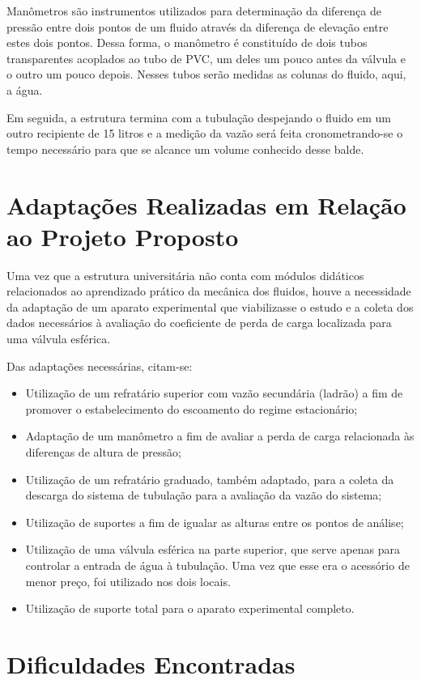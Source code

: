 Manômetros são instrumentos utilizados para determinação da diferença de 
pressão entre dois pontos de um fluido através
da diferença de elevação entre estes dois pontos. Dessa forma, o manômetro 
é constituído de dois tubos transparentes
acoplados ao tubo de PVC, um deles um pouco antes da válvula e o outro um 
pouco depois. Nesses tubos serão medidas as colunas do fluido, aqui, a água.

Em seguida, a estrutura termina com a tubulação despejando o fluido em um 
outro recipiente de 15 litros e a medição da vazão será feita cronometrando-se o
tempo necessário para que se alcance um volume conhecido desse balde.

\section{Adaptações Realizadas em Relação ao Projeto Proposto}%
\label{sec:adaptacoes}

Uma vez que a estrutura universitária não conta com módulos didáticos
relacionados ao aprendizado prático da mecânica dos fluidos, houve a necessidade
da adaptação de um aparato experimental que viabilizasse o estudo e a coleta dos
dados necessários à avaliação do coeficiente de perda de carga localizada para
uma válvula esférica.

Das adaptações necessárias, citam-se:
\begin{itemize}
\item Utilização de um refratário superior com vazão secundária (ladrão) a fim
  de promover o estabelecimento do escoamento do regime estacionário;
\item Adaptação de um manômetro a fim de avaliar a perda de carga relacionada às
  diferenças de altura de pressão;
\item Utilização de um refratário graduado, também adaptado, para a coleta da
  descarga do sistema de tubulação para a avaliação da vazão do sistema;
\item Utilização de suportes a fim de igualar as alturas entre os pontos de
  análise;
\item Utilização de uma válvula esférica na parte superior, que serve apenas
  para controlar a entrada de água à tubulação. Uma vez que esse era o acessório
  de menor preço, foi utilizado nos dois locais.
\item Utilização de suporte total para o aparato experimental completo.
\end{itemize}

\section{Dificuldades Encontradas}%
\label{sec:dificuldades}

